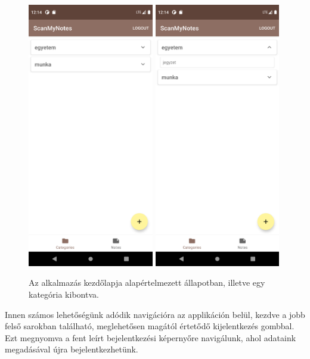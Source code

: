 \begin{figure}[!ht]
	\centering
	\includegraphics[width=55mm, keepaspectratio]{figures/notelist_closed.png}
	\includegraphics[width=55mm, keepaspectratio]{figures/notelist_open.png}
	\caption{Az alkalmazás kezdőlapja alapértelmezett állapotban, illetve egy kategória kibontva.}
	\label{fig:NoteListScreen}
\end{figure}

Innen számos lehetőségünk adódik navigációra az applikáción belül, kezdve a jobb felső sarokban található, meglehetősen magától értetődő kijelentkezés gombbal. Ezt megnyomva a fent leírt bejelentkezési képernyőre navigálunk, ahol adataink megadásával újra bejelentkezhetünk.

